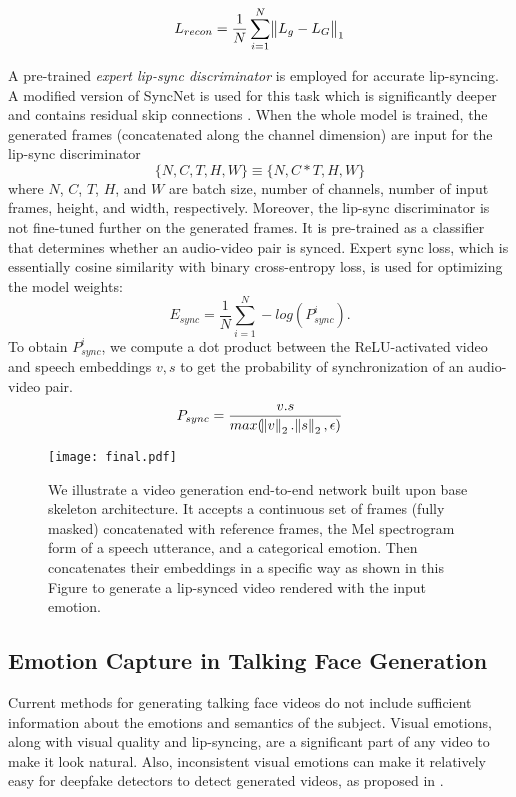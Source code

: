 \documentclass[accepted]{uai2023}
\begin{document}
\begin{equation}
    L_{recon} = \frac{1}{N}\sum_{i=1}^{N} \norm{L_{g}-L_{G}} _{1}
\end{equation}

A pre-trained \emph{expert lip-sync discriminator} is employed for accurate lip-syncing. A modified version of SyncNet \citep{chung2016out} is used for this task which is significantly deeper and contains residual skip connections \citep{he2016deep}.
When the whole model is trained, the generated frames (concatenated along the channel dimension) are input for the lip-sync discriminator 
\[ \{N,C,T,H,W\}  \equiv \{N,C*T,H,W\} \]
where $N$, $C$, $T$, $H$, and $W$ are batch size, number of channels, number of input frames, height, and width, respectively. Moreover, the lip-sync discriminator is not fine-tuned further on the generated frames. It is pre-trained as a classifier that determines whether an audio-video pair is synced.  Expert sync loss, which is essentially cosine similarity with binary cross-entropy loss, is used for optimizing the model weights:
\begin{equation}
    E_{sync} = \frac{1}{N}\sum_{i=1}^{N}-log(P_{sync}^{i}).
\end{equation}
To obtain $P_{sync}^{i}$, we compute a dot product between the ReLU-activated video and speech embeddings $v,s$ to get the probability of synchronization of an audio-video pair.
\begin{equation}
    P_{sync} = \frac{ v. s}{max(\norm{v}_{2}.\norm{s}_{2},\epsilon)}
\end{equation}

\begin{figure*}[t]
\texttt{[image: final.pdf]}
\caption{We illustrate a video generation end-to-end network built upon base skeleton architecture. It accepts a continuous set of frames (fully masked) concatenated with reference frames, the Mel spectrogram form of a speech utterance, and a categorical emotion. Then concatenates their embeddings in a specific way as shown in this Figure to generate a lip-synced video rendered with the input emotion.}
\label{fig:main_model}
\end{figure*}



\subsection{Emotion Capture in Talking Face Generation}
Current methods for generating talking face videos do not include sufficient information about the emotions and semantics of the subject. Visual emotions, along with visual quality and lip-syncing, are a significant part of any video to make it look natural. 
Also, inconsistent visual emotions can make it relatively easy for deepfake detectors to detect generated videos, as proposed in \citep{hosler2021deepfakes}.
\end{document}
